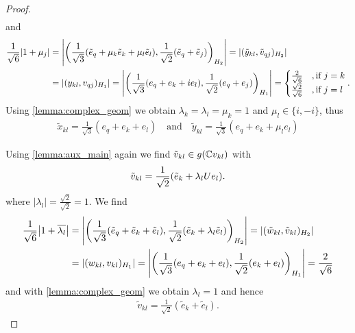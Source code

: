 \begin{proof}
\begin{align*}
	\end{align*}
	and 
	\begin{align*}
	\frac{1}{\sqrt{6}} {\left | 1 + \mu_j \right |} &= {\left | {\left ( \frac{1}{\sqrt{3}} {\left ( \tilde{e}_q + \mu_k \tilde{e}_k + \mu_l \tilde{e}_l \right )}, \frac{1}{\sqrt{2}} {\left ( \tilde{e}_q + \tilde{e}_j \right )} \right )}_{H_2} \right |} = |(\tilde{y}_{kl}, \tilde{v}_{qj})_{H_2}| \\
	&= |(y_{kl}, v_{qj})_{H_1}| = {\left | {\left ( \frac{1}{\sqrt{3}} {\left ( e_q + e_k + ie_l \right )}, \frac{1}{\sqrt{2}} (e_q + e_j) \right )}_{H_1} \right |} =
	\begin{cases}
		\frac{2}{\sqrt{6}} &, \text{if } j = k \\
		\frac{\sqrt{2}}{\sqrt{6}} &, \text{if } j = l
	\end{cases} .
	\end{align*}
	Using \ref{lemma:complex_geom} we obtain $\lambda_k = \lambda_l = \mu_k = 1$ and $\mu_l \in \{i, -i\}$, thus
	\begin{align*}
		\tilde{x}_{kl} = \frac{1}{\sqrt{3}}(e_q + e_k + e_l) \quad \text{and} \quad \tilde{y}_{kl} = \frac{1}{\sqrt{3}}(e_q + e_k + \mu_l e_l)
	\end{align*}
	
	Using \ref{lemma:aux_main} again we find $\tilde{v}_{kl} \in g(\mathbb{C} v_{kl})$ with
	\begin{align*}
		\tilde{v}_{kl} = \frac{1}{\sqrt{2}} {\left ( \tilde{e}_k + \lambda_l Ue_l \right )}.
	\end{align*}
	where $|\lambda_l|= \frac{\sqrt{2}}{\sqrt{2}} = 1$. We find
	\begin{align*}
		\frac{1}{\sqrt{6}} {\left | 1 + \overline{\lambda_l} \right |} &= {\left | {\left ( \frac{1}{\sqrt{3}} {\left ( \tilde{e}_q + \tilde{e}_k + \tilde{e}_l \right )}, \frac{1}{\sqrt{2}} {\left ( \tilde{e}_k + \lambda_l \tilde{e}_l \right )} \right )}_{H_2} \right |} = |(\tilde{w}_{kl}, \tilde{v}_{kl})_{H_2}| \\
		&= |(w_{kl}, v_{kl})_{H_1}| = {\left | {\left ( \frac{1}{\sqrt{3}} {\left ( e_q + e_k + e_l \right )}, \frac{1}{\sqrt{2}} (e_k + e_l) \right )}_{H_1} \right |} = \frac{2}{\sqrt{6}}
	\end{align*}
	and with \ref{lemma:complex_geom} we obtain $\lambda_l = 1$ and hence
	\begin{align*}
		\tilde{v}_{kl} = \frac{1}{\sqrt{2}}(\tilde{e}_k + \tilde{e}_l).
	\end{align*}
	

\end{proof}
